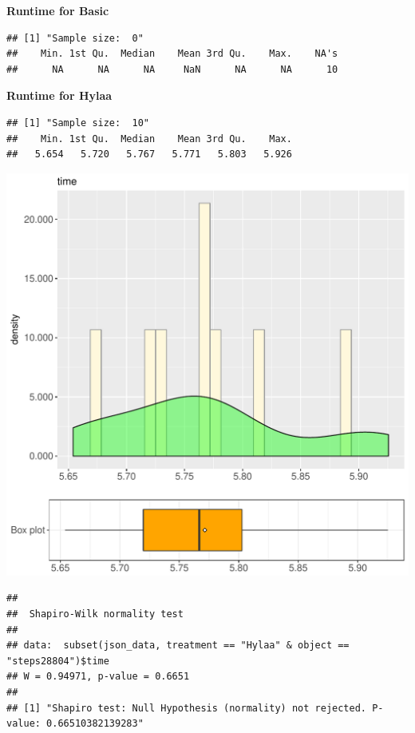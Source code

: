 \documentclass{article}\usepackage[]{graphicx}\usepackage[]{color}
\makeatletter
\def\maxwidth{ %
  \ifdim\Gin@nat@width>\linewidth
    \linewidth
  \else
    \Gin@nat@width
  \fi
}
\newenvironment{kframe}{%
 \def\at@end@of@kframe{}%
 \ifinner\ifhmode%
  \def\at@end@of@kframe{\end{minipage}}%
  \begin{minipage}{\columnwidth}%
 \fi\fi%
 \def\FrameCommand##1{\hskip\@totalleftmargin \hskip-\fboxsep
 \colorbox{shadecolor}{##1}\hskip-\fboxsep
     \hskip-\linewidth \hskip-\@totalleftmargin \hskip\columnwidth}%
 \MakeFramed {\advance\hsize-\width
   \@totalleftmargin\z@ \linewidth\hsize
   \@setminipage}}%
 {\par\unskip\endMakeFramed%
 \at@end@of@kframe}
\newenvironment{knitrout}{}{} %
\makeatother
\begin{document}
 \textbf{Runtime for Basic}
\begin{knitrout}
\color{fgcolor}\begin{kframe}
\begin{verbatim}
## [1] "Sample size:  0"
##    Min. 1st Qu.  Median    Mean 3rd Qu.    Max.    NA's 
##      NA      NA      NA     NaN      NA      NA      10
\end{verbatim}
\end{kframe}
\end{knitrout}
 \textbf{Runtime for Hylaa}
\begin{knitrout}
\color{fgcolor}\begin{kframe}
\begin{verbatim}
## [1] "Sample size:  10"
##    Min. 1st Qu.  Median    Mean 3rd Qu.    Max. 
##   5.654   5.720   5.767   5.771   5.803   5.926
\end{verbatim}
\end{kframe}
\includegraphics[width=\maxwidth]{figure/RH3_Hylaa_steps28804-1} 
\begin{kframe}\begin{verbatim}
## 
## 	Shapiro-Wilk normality test
## 
## data:  subset(json_data, treatment == "Hylaa" & object == "steps28804")$time
## W = 0.94971, p-value = 0.6651
## 
## [1] "Shapiro test: Null Hypothesis (normality) not rejected. P-value: 0.66510382139283"
\end{verbatim}
\end{kframe}
\end{knitrout}
  
\end{document}
